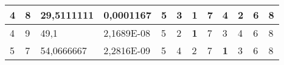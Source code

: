 \documentclass[conference]{IEEEtran}
\begin{document}
\begin{table*}[]
\begin{tabular}{|llll|llllllll|}
\multicolumn{1}{|l|}{4}                                                     & \multicolumn{1}{l|}{8}                                                        & \multicolumn{1}{l|}{29,5111111}                                                   & 0,0001167                      & \multicolumn{1}{l|}{5}                                                  & \multicolumn{1}{l|}{3}                                                  & \multicolumn{1}{l|}{\textbf{1}}                                         & \multicolumn{1}{l|}{7}                                                  & \multicolumn{1}{l|}{4}                                                  & \multicolumn{1}{l|}{2}                                                  & \multicolumn{1}{l|}{6}                                                  & 8                          \\ \hline
\multicolumn{1}{|l|}{4}                                                     & \multicolumn{1}{l|}{9}                                                        & \multicolumn{1}{l|}{49,1}                                                         & 2,1689E-08                     & \multicolumn{1}{l|}{5}                                                  & \multicolumn{1}{l|}{2}                                                  & \multicolumn{1}{l|}{\textbf{1}}                                         & \multicolumn{1}{l|}{7}                                                  & \multicolumn{1}{l|}{3}                                                  & \multicolumn{1}{l|}{4}                                                  & \multicolumn{1}{l|}{6}                                                  & 8                          \\ \hline
\multicolumn{1}{|l|}{5}                                                     & \multicolumn{1}{l|}{7}                                                        & \multicolumn{1}{l|}{54,0666667}                                                   & 2,2816E-09                     & \multicolumn{1}{l|}{5}                                                  & \multicolumn{1}{l|}{4}                                                  & \multicolumn{1}{l|}{2}                                                  & \multicolumn{1}{l|}{7}                                                  & \multicolumn{1}{l|}{\textbf{1}}                                         & \multicolumn{1}{l|}{3}                                                  & \multicolumn{1}{l|}{6}                                                  & 8                          \\ \hline

\end{tabular}
\end{table*}
\end{document}
